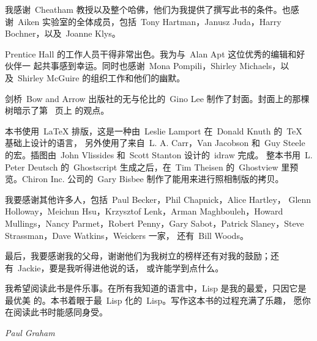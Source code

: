我感谢~Cheatham 教授以及整个哈佛，他们为我提供了撰写此书的条件。也感谢~Aiken
实验室的全体成员，包括~Tony Hartman，Janusz Juda，Harry Bochner，以及~Joanne
Klys。

Prentice Hall 的工作人员干得非常出色。我为与~Alan Apt 这位优秀的编辑和好伙伴一
起共事感到幸运。同时也感谢~Mona Pompili，Shirley Michaels，以及~Shirley
McGuire 的组织工作和他们的幽默。

剑桥~Bow and Arrow 出版社的无与伦比的~Gino Lee 制作了封面。封面上的那棵树暗示了第~\pageref{sec:functions_from_lists} 页上
的观点。

本书使用~\LaTeX{} 排版，这是一种由~Leslie Lamport 在~Donald Knuth 的~\TeX{}
基础上设计的语言，
另外使用了来自~L. A. Carr，Van Jacobson 和~Guy Steele 的宏。插图由~John
Vlissides 和~Scott Stanton 设计的~idraw 完成。
整本书用~L. Peter Deutsch 的~Ghostscript 生成之后，在~Tim Theisen
的~Ghostview 里预览。Chiron Inc. 公司的~Gary Bisbee 制作了能用来进行照相制版的拷贝。

我要感谢其他许多人，包括~Paul Becker，Phil Chapnick，Alice Hartley，
Glenn Holloway，Meichun Hsu，Krzysztof Lenk，Arman Maghbouleh，Howard
Mullings，Nancy Parmet，Robert Penny，Gary Sabot，Patrick Slaney，Steve
Strassman，Dave Watkins，Weickers 一家，
还有~Bill Woods。

最后，我要感谢我的父母，谢谢他们为我树立的榜样还有对我的鼓励；还有~Jackie，要是我听得进他说的话，
或许能学到点什么。

\vspace{5ex}

我希望阅读此书是件乐事。在所有我知道的语言中，Lisp 是我的最爱，只因它是最优美
的。本书着眼于最~Lisp 化的~Lisp。写作这本书的过程充满了乐趣，
愿你在阅读此书时能感同身受。

\vspace{1in}

\hfill\emph{Paul Graham}

\vfill

